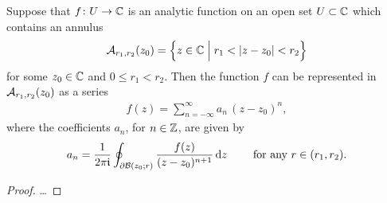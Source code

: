 \begin{theorem}
  \label{thm:ANALYTIC_FUNCTION_LAURENT_SERIES}
  Suppose that $f \colon U \to \bC$ is an analytic function
  on an open set $U \subset \bC$ which contains
  an annulus
  \begin{align*}
    \AnnRRC{r_1}{r_2}{z_0} = \Big\{z \in \bC \; \Big| \; r_1 < |z - z_0| < r_2 \Big\}
  \end{align*}
  for some $z_0 \in \bC$ and $0 \le r_1 < r_2$.
  Then the function $f$ can be represented in $\AnnRRC{r_1}{r_2}{z_0}$
  as a series
  \begin{align*}
    f(z) = \sum_{n=-\infty}^\infty a_n \, (z-z_0)^n ,
  \end{align*}
  where the coefficients $a_n$, for $n \in \bZ$, are given by
  \begin{align*}
    a_n = \frac{1}{2\pi \ii}
      \oint_{\bdry \BallRC{r}{z_0}} \frac{f(z)}{(z - z_0)^{n+1}} \, \ud z
    \qquad \text{ for any } r \in (r_1, r_2) .
  \end{align*}
\end{theorem}
\begin{proof}
  \ldots
\end{proof}
